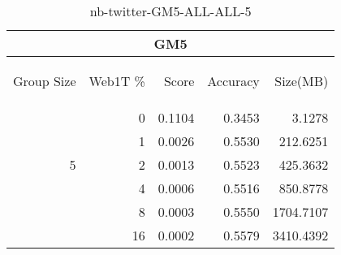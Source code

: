 \begin{center}
\begin{table}[htbp]
\begin{tabular}{ | r | r | r | r | r |}
\hline
\multicolumn{5}{|c|}{GM5}\\
\hline
\begin{sideways}Group Size\end{sideways} & \begin{sideways}Web1T \%\end{sideways} & \begin{sideways}Score\end{sideways} & \begin{sideways}Accuracy\end{sideways} & \begin{sideways}Size(MB)\end{sideways}\\
\hline
\multirow{5}{*}{5}
 & 0 & 0.1104 & 0.3453 & 3.1278\\ \cline{2-5}
 & 1 & 0.0026 & 0.5530 & 212.6251\\ \cline{2-5}
 & 2 & 0.0013 & 0.5523 & 425.3632\\ \cline{2-5}
 & 4 & 0.0006 & 0.5516 & 850.8778\\ \cline{2-5}
 & 8 & 0.0003 & 0.5550 & 1704.7107\\ \cline{2-5}
 & 16 & 0.0002 & 0.5579 & 3410.4392\\ \cline{2-5}
\hline
\end{tabular}
\caption{nb-twitter-GM5-ALL-ALL-5}
\label{table:nb-twitter-GM5-ALL-ALL-5}
\end{table}
\end{center}

